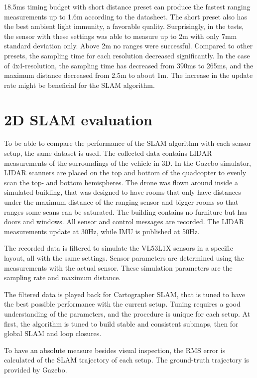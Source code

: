 \documentclass[conference]{IEEEtran}
\begin{document}
18.5ms timing budget with short distance preset can produce the fastest ranging measurements up to 1.6m according
to the datasheet. The short preset also has the best ambient light immunity, a favorable quality. Surprisingly,
in the tests, the sensor with these settings was able to measure up to 2m with only 7mm standard deviation only. 
Above 2m no ranges were successful. Compared to other presets, the sampling time for each resolution decreased
significantly. In the case of 4x4-resolution, the sampling time has decreased from 390ms to 265ms, and the 
maximum distance decreased from 2.5m to about 1m. The increase in the update rate might be beneficial for 
the SLAM algorithm. 

\section{2D SLAM evaluation}

To be able to compare the performance of the SLAM algorithm with each sensor setup, the same dataset 
is used. The collected data contains LIDAR measurements of the surroundings of the vehicle in 3D. In the Gazebo simulator, 
LIDAR scanners are placed on the top and bottom of the quadcopter to evenly scan the top- and bottom 
hemispheres. The drone was flown around inside a simulated building, that was designed to have rooms that only 
have distances under the maximum distance of the ranging sensor and bigger rooms so that ranges some scans 
can be saturated. The building contains no furniture but has doors and windows. All sensor and control messages are recorded. The LIDAR measurements update at 30Hz, while IMU is published at 50Hz.

The recorded data is filtered to simulate the VL53L1X sensors in a specific layout, all with the same settings. 
Sensor parameters are determined using the measurements with the actual sensor. These simulation parameters are
the sampling rate and maximum distance. 

The filtered data is played back for Cartographer SLAM, that is tuned to have the best possible performance
with the current setup. Tuning requires a good understanding of the parameters, and the procedure is unique for
each setup. At first, the algorithm is tuned to build stable and consistent submaps, then for global SLAM and
loop closures.

To have an absolute measure besides visual inspection, the RMS error is calculated of the SLAM trajectory of 
each setup. The ground-truth trajectory is provided by Gazebo.
 
\end{document}

